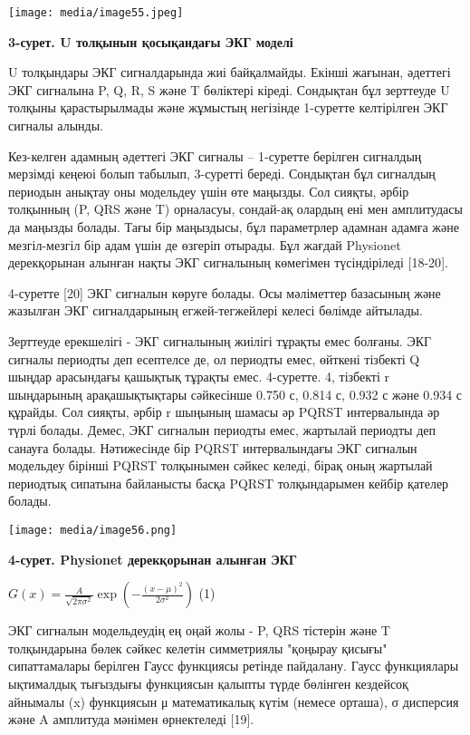 \documentclass[
]{article}
\begin{document}
\texttt{[image: media/image55.jpeg]}

\textbf{3-сурет. U толқынын қосықандағы ЭКГ моделі}

U толқындары ЭКГ сигналдарында жиі байқалмайды. Екінші жағынан, әдеттегі
ЭКГ сигналына P, Q, R, S және T бөліктері кіреді. Сондықтан бұл
зерттеуде U толқыны қарастырылмады және жұмыстың негізінде 1-суретте
келтірілген ЭКГ сигналы алынды.

Кез-келген адамның әдеттегі ЭКГ сигналы -- 1-суретте берілген сигналдың
мерзімді кеңеюі болып табылып, 3-суретті береді. Сондықтан бұл сигналдың
периодын анықтау оны модельдеу үшін өте маңызды. Сол сияқты, әрбір
толқынның (P, QRS және T) орналасуы, сондай-ақ олардың ені мен
амплитудасы да маңызды болады. Тағы бір маңыздысы, бұл параметрлер
адамнан адамға және мезгіл-мезгіл бір адам үшін де өзгеріп отырады. Бұл
жағдай Physionet дерекқорынан алынған нақты ЭКГ сигналының көмегімен
түсіндіріледі {[}18-20{]}.

4-суретте {[}20{]} ЭКГ сигналын көруге болады. Осы мәліметтер базасының
және жазылған ЭКГ сигналдарының егжей-тегжейлері келесі бөлімде
айтылады.

Зерттеуде ерекшелігі - ЭКГ сигналының жиілігі тұрақты емес болғаны. ЭКГ
сигналы периодты деп есептелсе де, ол периодты емес, өйткені тізбекті Q
шыңдар арасындағы қашықтық тұрақты емес. 4-суретте. 4, тізбекті r
шыңдарының арақашықтықтары сәйкесінше 0.750 с, 0.814 с, 0.932 с және
0.934 с құрайды. Сол сияқты, әрбір r шыңының шамасы әр PQRST
интервалында әр түрлі болады. Демес, ЭКГ сигналын периодты емес,
жартылай периодты деп санауға болады. Нәтижесінде бір PQRST
интервалындағы ЭКГ сигналын модельдеу бірінші PQRST толқынымен сәйкес
келеді, бірақ оның жартылай периодтық сипатына байланысты басқа PQRST
толқындарымен кейбір қателер болады.

\texttt{[image: media/image56.png]}

\textbf{4-сурет. Physionet дерекқорынан алынған ЭКГ}

\(G(x) = \frac{A}{\sqrt{2\pi\sigma^{2}}}\exp\left( - \frac{(x - \mu)^{2}}{2\sigma^{2}} \right)\)
(1)

ЭКГ сигналын модельдеудің ең оңай жолы - P, QRS тістерін және T
толқындарына бөлек сәйкес келетін симметриялы "қоңырау қисығы"
сипаттамалары берілген Гаусс функциясы ретінде пайдалану. Гаусс
функциялары ықтималдық тығыздығы функциясын қалыпты түрде бөлінген
кездейсоқ айнымалы (x) функциясын μ математикалық күтім (немесе орташа),
σ дисперсия және A амплитуда мәнімен өрнектеледі {[}19{]}.
\end{document}
